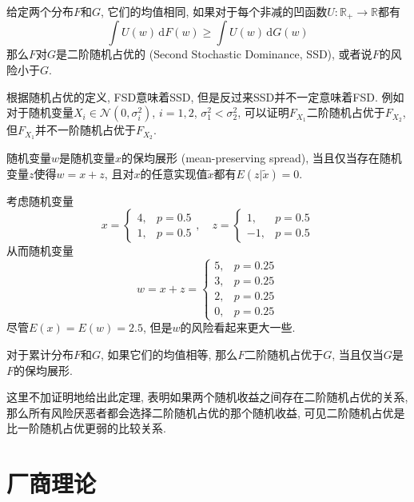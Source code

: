 \documentclass[cn, 12pt, math=mtpro2, bibstyle=apa, blue]{elegantbook}
\newcommand{\R}{\mathbb{R}}
\begin{document}
\begin{definition}[二阶随机占优]
给定两个分布$F$和$G$, 它们的均值相同, 如果对于每个非减的凹函数$U:\R_+\to\R$都有
$$\int U(w)\,\text{d}F(w)\geq\int U(w)\,\text{d}G(w)$$
那么$F$对$G$是二阶随机占优的 (Second Stochastic Dominance, SSD), 或者说$F$的风险小于$G$.
\end{definition}

根据随机占优的定义, FSD意味着SSD, 但是反过来SSD并不一定意味着FSD. 例如对于随机变量$X_i\in \mathcal{N}(0,\sigma_i^2)$, $i=1,2$, $\sigma_1^2<\sigma_2^2$, 可以证明$F_{X_1}$二阶随机占优于$F_{X_2}$, 但$F_{X_1}$并不一阶随机占优于$F_{X_2}$.

\begin{definition}[保均展形]
随机变量$w$是随机变量$x$的保均展形 (mean-preserving spread), 当且仅当存在随机变量$z$使得$w=x+z$, 且对$x$的任意实现值$\tilde{x}$都有$E(z|\tilde{x})=0$.
\end{definition}

\begin{example}
考虑随机变量
$$x=\begin{cases}
      4, & p=0.5 \\
      1, & p=0.5
    \end{cases},\quad z=\begin{cases}
                          1, & p=0.5 \\
                          -1, & p=0.5
                        \end{cases}$$
从而随机变量
$$w=x+z=\begin{cases}
          5, & p=0.25 \\
          3, & p=0.25 \\
          2, & p=0.25 \\
          0, & p=0.25
        \end{cases}$$
尽管$E(x)=E(w)=2.5$, 但是$w$的风险看起来更大一些.
\end{example}

\begin{theorem}
  对于累计分布$F$和$G$, 如果它们的均值相等, 那么$F$二阶随机占优于$G$, 当且仅当$G$是$F$的保均展形.
\end{theorem}
这里不加证明地给出此定理, 表明如果两个随机收益之间存在二阶随机占优的关系, 那么所有风险厌恶者都会选择二阶随机占优的那个随机收益, 可见二阶随机占优是比一阶随机占优更弱的比较关系.

\chapter{厂商理论}
\end{document}
